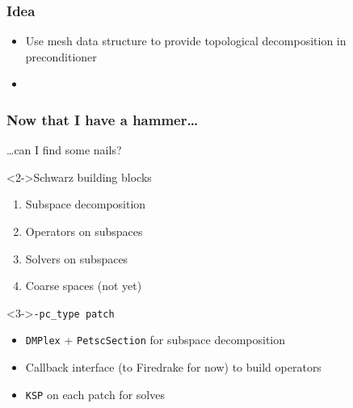 \documentclass[presentation,aspectratio=43]{beamer}
\begin{document}
\begin{frame}
  \frametitle{Idea}
  \begin{itemize}
  \item Use mesh data structure to provide topological decomposition
    in preconditioner
  \item 
  \end{itemize}
\end{frame}
\begin{frame}
  \frametitle{Now that I have a hammer\ldots}
  \ldots can I find some nails?

  \begin{block}<2->{Schwarz building blocks}
    \begin{enumerate}
    \item Subspace decomposition
    \item Operators on subspaces
    \item Solvers on subspaces
    \item Coarse spaces (not yet)
    \end{enumerate}
  \end{block}

  \begin{block}<3->{\texttt{-pc\_type patch}}
    \begin{itemize}
    \item \texttt{DMPlex} + \texttt{PetscSection} for subspace decomposition
    \item Callback interface (to Firedrake for now) to build operators
    \item \texttt{KSP} on each patch for solves
    \end{itemize}
  \end{block}
\end{frame}
\end{document}
